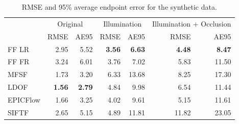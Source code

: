 \begin{table}
    \centering
    \begin{tabular}{lrrrrrr}
                                                                                                                                               \toprule
         & \multicolumn{2}{c}{Original}            & \multicolumn{2}{c}{Illumination}        & \multicolumn{2}{c}{Illumination + Occlusion} \\
         & {\scriptsize RMSE} & {\scriptsize AE95} & {\scriptsize RMSE} & {\scriptsize AE95} & {\scriptsize RMSE} & {\scriptsize AE95}      \\ \toprule
FF LR    & 2.95               & 5.52               & {\bf 3.56}         & {\bf 6.63}         & {\bf 4.48}         & {\bf 8.47}              \\
FF FR    & 3.24               & 6.01               & 3.76               & 7.02               & 5.83               & 11.50                   \\
MFSF     & 1.73               & 3.20               & 6.33               & 13.68              & 8.25               & 17.30                   \\
LDOF     & {\bf 1.56}         & {\bf 2.79}         & 4.84               & 9.98               & 6.54               & 11.44                   \\
EPICFlow & 1.66               & 3.25               & 4.02               & 9.61               & 5.15               & 11.61                   \\
SIFTF    & 2.65               & 5.15               & 4.89               & 11.81              & 11.82              & 23.05                   \\ \bottomrule
    \end{tabular}
    \caption{RMSE and 95\% average endpoint error for the synthetic data.}
\label{tbl:face_flow_synthetic}
\end{table}
